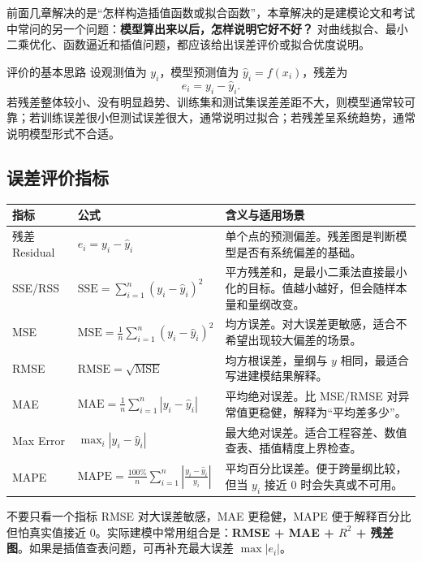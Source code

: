 \documentclass[11pt,a4paper]{ctexart}
\begin{document}
前面几章解决的是“怎样构造插值函数或拟合函数”，本章解决的是建模论文和考试中常问的另一个问题：\textbf{模型算出来以后，怎样说明它好不好？} 对曲线拟合、最小二乘优化、函数逼近和插值问题，都应该给出误差评价或拟合优度说明。

\begin{keybox}{评价的基本思路}
设观测值为 $y_i$，模型预测值为 $\hat y_i=f(x_i)$，残差为
\[
 e_i = y_i-\hat y_i.
\]
若残差整体较小、没有明显趋势、训练集和测试集误差差距不大，则模型通常较可靠；若训练误差很小但测试误差很大，通常说明过拟合；若残差呈系统趋势，通常说明模型形式不合适。
\end{keybox}

\subsection{误差评价指标}

\begin{longtable}{p{2.7cm}p{5.4cm}p{5.9cm}}
\toprule
指标 & 公式 & 含义与适用场景 \\
\midrule
残差 Residual & $e_i=y_i-\hat y_i$ & 单个点的预测偏差。残差图是判断模型是否有系统偏差的基础。 \\
\midrule
SSE/RSS & $\mathrm{SSE}=\sum_{i=1}^n (y_i-\hat y_i)^2$ & 平方残差和，是最小二乘法直接最小化的目标。值越小越好，但会随样本量和量纲改变。 \\
\midrule
MSE & $\mathrm{MSE}=\frac{1}{n}\sum_{i=1}^n (y_i-\hat y_i)^2$ & 均方误差。对大误差更敏感，适合不希望出现较大偏差的场景。 \\
\midrule
RMSE & $\mathrm{RMSE}=\sqrt{\mathrm{MSE}}$ & 均方根误差，量纲与 $y$ 相同，最适合写进建模结果解释。 \\
\midrule
MAE & $\mathrm{MAE}=\frac{1}{n}\sum_{i=1}^n |y_i-\hat y_i|$ & 平均绝对误差。比 MSE/RMSE 对异常值更稳健，解释为“平均差多少”。 \\
\midrule
Max Error & $\max_i |y_i-\hat y_i|$ & 最大绝对误差。适合工程容差、数值查表、插值精度上界检查。 \\
\midrule
MAPE & $\mathrm{MAPE}=\frac{100\%}{n}\sum_{i=1}^n\left|\frac{y_i-\hat y_i}{y_i}\right|$ & 平均百分比误差。便于跨量纲比较，但当 $y_i$ 接近 0 时会失真或不可用。 \\
\bottomrule
\end{longtable}

\begin{warnbox}{不要只看一个指标}
RMSE 对大误差敏感，MAE 更稳健，MAPE 便于解释百分比但怕真实值接近 0。实际建模中常用组合是：\textbf{RMSE + MAE + $R^2$ + 残差图}。如果是插值查表问题，可再补充最大误差 $\max |e_i|$。
\end{warnbox}
\end{document}
